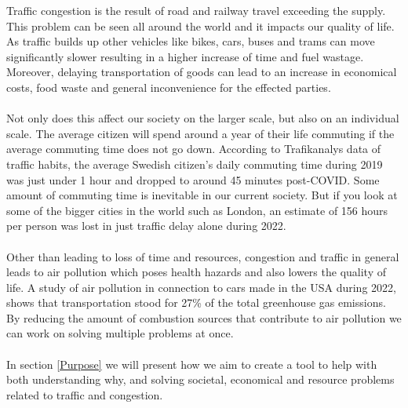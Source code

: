 
Traffic congestion is the result of road and railway travel exceeding the supply. This problem can be seen all around the world\cite{inrix} and it impacts our quality of life. As traffic builds up other vehicles like bikes, cars, buses and trams can move significantly slower resulting in a higher increase of time and fuel wastage. Moreover, delaying transportation of goods can lead to an increase in economical costs, food waste and general inconvenience for the effected parties.
\\\\
Not only does this affect our society on the larger scale, but also on an individual scale. The average citizen will spend around a year of their life commuting if the average commuting time does not go down. According to Trafikanalys data of traffic habits\cite{trafikanalys_2022}, the average Swedish citizen's daily commuting time during 2019 was just under 1 hour and dropped to around 45 minutes post-COVID. Some amount of commuting time is inevitable in our current society. But if you look at some of the bigger cities in the world such as London, an estimate of 156 hours per person was lost in just traffic delay alone during 2022\cite{inrix}.
\\\\
Other than leading to loss of time and resources, congestion and traffic in general leads to air pollution which poses health hazards and also lowers the quality of life\cite{urban_2004}. A study of air pollution in connection to cars made in the USA during 2022, shows that transportation stood for 27\% of the total greenhouse gas emissions\cite{treehugger_2022}. By reducing the amount of combustion sources that contribute to air pollution we can work on solving multiple problems at once.
\\\\
In section \ref{Purpose} we will present how we aim to create a tool to help with both understanding why, and solving societal, economical and resource problems related to traffic and congestion.